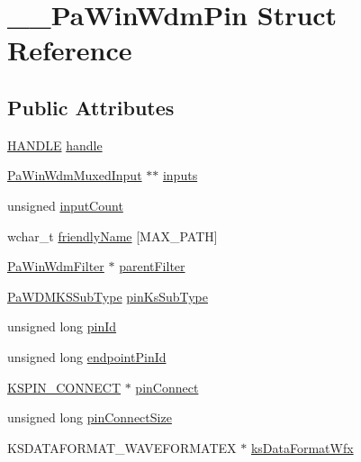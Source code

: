 \hypertarget{struct_____pa_win_wdm_pin}{}\section{\+\_\+\+\_\+\+Pa\+Win\+Wdm\+Pin Struct Reference}
\label{struct_____pa_win_wdm_pin}
\subsection*{Public Attributes}
\begin{DoxyCompactItemize}
\item 
\hyperlink{_sound_touch_d_l_l_8h_aa8c0374618b33785ccb02f74bcfebc46}{H\+A\+N\+D\+LE} \hyperlink{struct_____pa_win_wdm_pin_a60e3d7a05346b1ce3e8e910e9d1c4fb8}{handle}
\item 
\hyperlink{pa__win__wdmks_8c_a0be015bebf38da0f5c27b19866c31716}{Pa\+Win\+Wdm\+Muxed\+Input} $\ast$$\ast$ \hyperlink{struct_____pa_win_wdm_pin_ae08e82747f231ea0365211c5dbbc48a7}{inputs}
\item 
unsigned \hyperlink{struct_____pa_win_wdm_pin_a4e8be021efbd43cf14cb3b40e501d4eb}{input\+Count}
\item 
wchar\+\_\+t \hyperlink{struct_____pa_win_wdm_pin_ad20963ecc38fe667f890dd6939b324a2}{friendly\+Name} \mbox{[}M\+A\+X\+\_\+\+P\+A\+TH\mbox{]}
\item 
\hyperlink{pa__win__wdmks_8c_add25dc7e76c77419d4520c774371efe4}{Pa\+Win\+Wdm\+Filter} $\ast$ \hyperlink{struct_____pa_win_wdm_pin_a6f391ad5ef481be61f92a2c99f8ce3a1}{parent\+Filter}
\item 
\hyperlink{pa__win__wdmks_8h_ab1fecd3bd8c22ca5820fee46fc9d89c2}{Pa\+W\+D\+M\+K\+S\+Sub\+Type} \hyperlink{struct_____pa_win_wdm_pin_a8f64c1157494c02e8be9d85d72f359fe}{pin\+Ks\+Sub\+Type}
\item 
unsigned long \hyperlink{struct_____pa_win_wdm_pin_a81ab014de4b698e66915fb28e01cb7c7}{pin\+Id}
\item 
unsigned long \hyperlink{struct_____pa_win_wdm_pin_a3f3942f6c97d908f03f559998a1daafb}{endpoint\+Pin\+Id}
\item 
\hyperlink{struct_k_s_p_i_n___c_o_n_n_e_c_t}{K\+S\+P\+I\+N\+\_\+\+C\+O\+N\+N\+E\+CT} $\ast$ \hyperlink{struct_____pa_win_wdm_pin_a2c0a3fa53ea7dbc62ef29f9ee4b5ff2c}{pin\+Connect}
\item 
unsigned long \hyperlink{struct_____pa_win_wdm_pin_a77f9537f17bc86095bfc5646de673da5}{pin\+Connect\+Size}
\item 
K\+S\+D\+A\+T\+A\+F\+O\+R\+M\+A\+T\+\_\+\+W\+A\+V\+E\+F\+O\+R\+M\+A\+T\+EX $\ast$ \hyperlink{struct_____pa_win_wdm_pin_ac22b41ab27423a1fe5b96d1b675d62cb}{ks\+Data\+Format\+Wfx}
$$
\end{DoxyCompactItemize}
